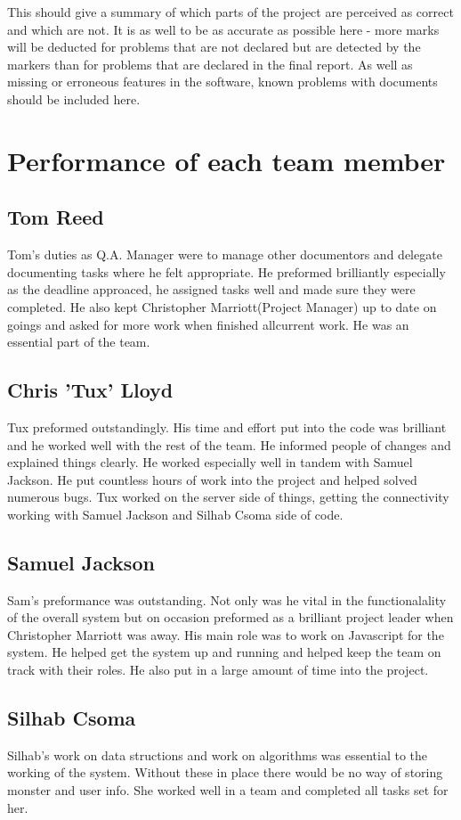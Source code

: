 \documentclass{project}
\begin{document}
This should give a summary of which parts of the project are perceived as correct and
which are not. It is as well to be as accurate as possible here - more marks will be deducted for problems that are
not declared but are detected by the markers than for problems that are declared in the final report. As well as
missing or erroneous features in the software, known problems with documents should be included here.

\section{Performance of each team member}
\subsection{Tom Reed}
Tom's duties as Q.A. Manager were to manage other documentors and delegate documenting tasks where he felt appropriate. He preformed brilliantly especially as the deadline approaced, he assigned tasks well and made sure they were completed. He also kept Christopher Marriott(Project Manager) up to date on goings and asked for more work when finished allcurrent work. He was an essential part of the team. 

\subsection{Chris 'Tux' Lloyd}
Tux preformed outstandingly. His time and effort put into the code was brilliant and he worked well with the rest of the team. He informed people of changes and explained things clearly. He worked especially well in tandem with Samuel Jackson. He put countless hours of work into the project and helped solved numerous bugs. Tux worked on the server side of things, getting the connectivity working with Samuel Jackson and Silhab Csoma side of code.

\subsection{Samuel Jackson}
Sam's preformance was outstanding. Not only was he vital in the functionalality of the overall system but on occasion preformed as a brilliant project leader when Christopher Marriott was away. His main role was to work on Javascript for the system. He helped get the system up and running and helped keep the team on track with their roles. He also put in a large amount of time into the project.

\subsection{Silhab Csoma}
Silhab's work on data structions and work on algorithms was essential to the working of the system. Without these in place there would be no way of storing monster and user info. She worked well in a team and completed all tasks set for her.
\end{document}
